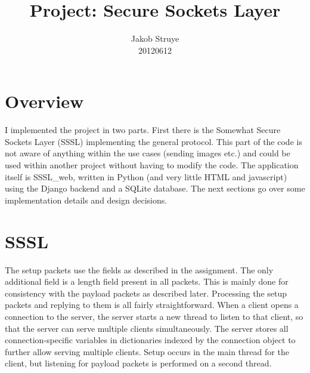 \documentclass{article}
\begin{document}
\title{Project: Secure Sockets Layer}
\author{Jakob Struye \\ 20120612}
\maketitle



\section{Overview}
I implemented the project in two parts. First there is the Somewhat Secure Sockets Layer (SSSL) implementing the general protocol. This part of the code is not aware of anything within the use cases (sending images etc.) and could be used within another project without having to modify the code. The application itself is SSSL\_web, written in Python (and very little HTML and javascript) using the Django backend and a SQLite database. The next sections go over some implementation details and design decisions.

\section{SSSL}
The setup packets use the fields as described in the assignment. The only additional field is a length field present in all packets. This is mainly done for consistency with the payload packets as described later. Processing the setup packets and replying to them is all fairly straightforward. When a client opens a connection to the server, the server starts a new thread to listen to that client, so that the server can serve multiple clients simultaneously. The server stores all connection-specific variables in dictionaries indexed by the connection object to further allow serving multiple clients. Setup occurs in the main thread for the client, but listening for payload packets is performed on a second thread. \\ \\
\end{document}
